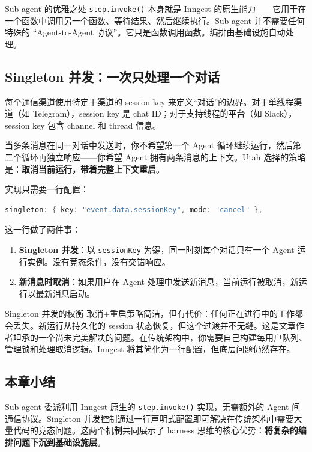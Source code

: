 \begin{importantbox}{Sub-agent 的优雅之处}
\texttt{step.invoke()} 本身就是 Inngest 的原生能力——它用于在一个函数中调用另一个函数、等待结果、然后继续执行。Sub-agent 并不需要任何特殊的 ``Agent-to-Agent 协议''。它只是函数调用函数。编排由基础设施自动处理。
\end{importantbox}

\subsection{Singleton 并发：一次只处理一个对话}

每个通信渠道使用特定于渠道的 session key 来定义``对话''的边界。对于单线程渠道（如 Telegram），session key 是 chat ID；对于支持线程的平台（如 Slack），session key 包含 channel 和 thread 信息。

当多条消息在同一对话中发送时，你不希望第一个 Agent 循环继续运行，然后第二个循环再独立响应——你希望 Agent 拥有两条消息的上下文。Utah 选择的策略是：\textbf{取消当前运行，带着完整上下文重启}。

实现只需要一行配置：

\begin{lstlisting}[caption={Singleton 并发配置},language=Java]
singleton: { key: "event.data.sessionKey", mode: "cancel" },
\end{lstlisting}

这一行做了两件事：

\begin{enumerate}
    \item \textbf{Singleton 并发}：以 \texttt{sessionKey} 为键，同一时刻每个对话只有一个 Agent 运行实例。没有竞态条件，没有交错响应。
    \item \textbf{新消息时取消}：如果用户在 Agent 处理中发送新消息，当前运行被取消，新运行以最新消息启动。
\end{enumerate}

\begin{warningbox}{Singleton 并发的权衡}
取消+重启策略简洁，但有代价：任何正在进行中的工作都会丢失。新运行从持久化的 session 状态恢复，但这个过渡并不无缝。这是文章作者坦承的一个尚未完美解决的问题。在传统架构中，你需要自己构建每用户队列、管理锁和处理取消逻辑。Inngest 将其简化为一行配置，但底层问题仍然存在。
\end{warningbox}

\subsection{本章小结}

Sub-agent 委派利用 Inngest 原生的 \texttt{step.invoke()} 实现，无需额外的 Agent 间通信协议。Singleton 并发控制通过一行声明式配置即可解决在传统架构中需要大量代码的竞态问题。这两个机制共同展示了 harness 思维的核心优势：\textbf{将复杂的编排问题下沉到基础设施层}。



